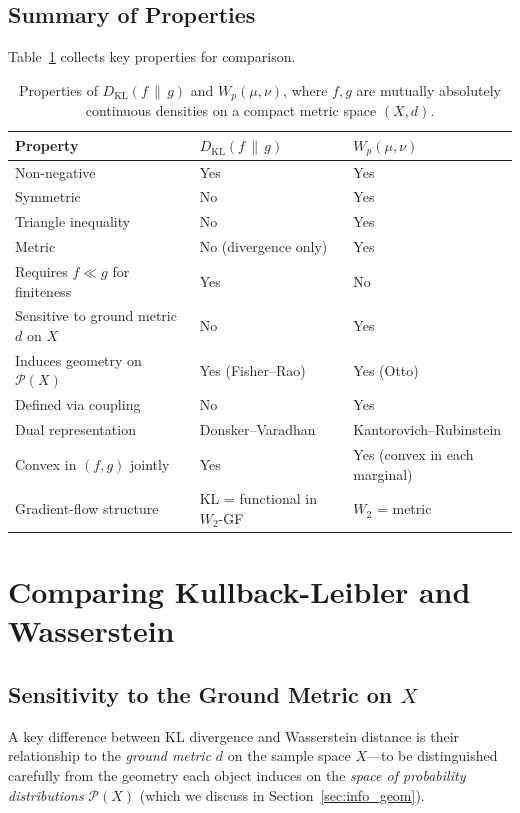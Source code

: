 \documentclass[12pt]{article}
\newcommand{\KL}[2]{D_{\mathrm{KL}}\!\left(#1\,\|\,#2\right)}
\newcommand{\calP}{\mathcal{P}}
\begin{document}
\subsection{Summary of Properties}

Table~\ref{tab:properties} collects key properties for
comparison.

\begin{table}[ht]
\centering
\caption{Properties of $\KL{f}{g}$ and $W_p(\mu,\nu)$, where $f,g$
are mutually absolutely continuous densities on a compact metric space
$(X,d)$.}
\label{tab:properties}
\medskip
\begin{tabular}{p{4.5cm}ll}
\toprule
Property & $\KL{f}{g}$ & $W_p(\mu,\nu)$ \\
\midrule
Non-negative & Yes & Yes \\
Symmetric & No & Yes \\
Triangle inequality & No & Yes \\
Metric & No (divergence only) & Yes \\
Requires $f \ll g$ for finiteness & Yes & No \\
Sensitive to ground metric $d$ on $X$ & No & Yes \\
Induces geometry on $\calP(X)$ & Yes (Fisher--Rao) & Yes (Otto) \\
Defined via coupling & No & Yes \\
Dual representation & Donsker--Varadhan & Kantorovich--Rubinstein \\
Convex in $(f,g)$ jointly & Yes & Yes (convex in each marginal) \\
Gradient-flow structure & KL = functional in $W_2$-GF & $W_2$ = metric \\
\bottomrule
\end{tabular}
\end{table}

\section{Comparing Kullback-Leibler and Wasserstein}
\label{sec:comparison}

\subsection{Sensitivity to the Ground Metric on $X$}

A key difference between KL divergence and Wasserstein distance
is their relationship to the \emph{ground metric} $d$ on the
sample space $X$---to be distinguished carefully from the
geometry each object induces on the \emph{space of probability
distributions} $\calP(X)$ (which we discuss in
Section~\ref{sec:info_geom}).
\end{document}
